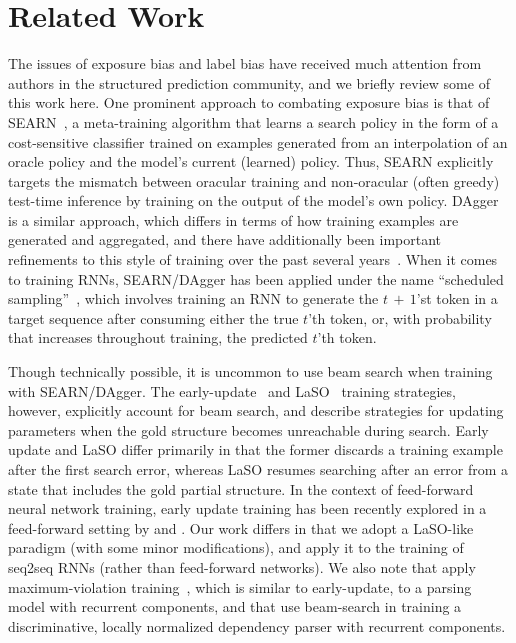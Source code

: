 \documentclass[11pt,letterpaper]{article}
\begin{document}
%
 
\section{Related Work}
\label{sec:relatedwork}
The issues of exposure bias and label bias have received much
attention from authors in the structured prediction community, and we
briefly review some of this work here. One prominent approach to
combating exposure bias is that of SEARN~\cite{daume09search}, a
meta-training algorithm that learns a search policy in the form of a
cost-sensitive classifier trained on examples generated from an
interpolation of an oracle policy and the model's current (learned)
policy. Thus, SEARN explicitly targets the mismatch between oracular
training and non-oracular (often greedy) test-time inference by
training on the output of the model's own
policy. DAgger~\cite{ross11a} is a similar approach, which differs in
terms of how training examples are generated and aggregated, and there
have additionally been important refinements to this style of training
over the past several years~\cite{chang15efficient}. When it comes to
training RNNs, SEARN/DAgger has been applied under the name
``scheduled sampling''~\cite{bengio15scheduled}, which involves
training an RNN to generate the $t\,{+}\,1$'st token in a target
sequence after consuming either the true $t$'th token, or, with
probability that increases throughout training, the predicted $t$'th
token.

Though technically possible, it is uncommon to use beam search when
training with SEARN/DAgger. The
early-update~\cite{collins04incremental} and
LaSO~\cite{daume05learning} training strategies, however, explicitly
account for beam search, and describe strategies for updating
parameters when the gold structure becomes unreachable during
search. Early update and LaSO differ primarily in that the former
discards a training example after the first search error, whereas LaSO
resumes searching after an error from a state that includes the gold
partial structure. In the context of feed-forward neural network
training, early update training has been recently explored in a
feed-forward setting by  and
. Our work differs in that we adopt a
LaSO-like paradigm (with some minor modifications), and apply it to
the training of seq2seq RNNs (rather than feed-forward networks). We
also note that  apply
maximum-violation training~\cite{huang12structured}, which is similar
to early-update, to a parsing model with 
recurrent components, and that  use
beam-search in training a discriminative, locally normalized
dependency parser with recurrent components.
\end{document}
